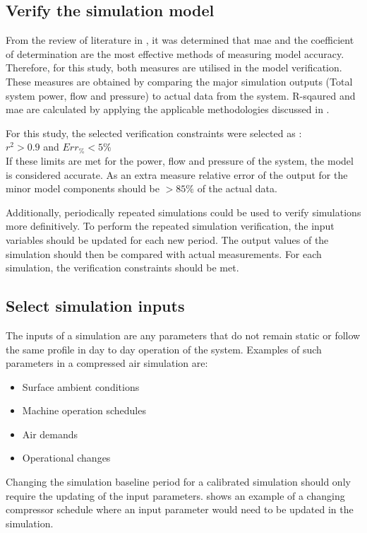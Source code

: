 	\subsection{Verify the simulation model}
	From the review of literature in , it was determined that \gls{mae} and the coefficient of determination are the most effective methods of measuring model accuracy. Therefore, for this study, both measures are utilised in the model verification. These measures are obtained by comparing the major simulation outputs (Total system power, flow and pressure) to actual data from the system. R-sqaured and \gls{mae} are calculated by applying the applicable methodologies discussed in .	
	\par 
	For this study, the selected verification constraints were selected as : \\ {$r^2 > 0.9 $ and $ Err_{\%} < 5\% $}\\ If these limits are met for the power, flow and pressure of the system, the model is considered accurate. As an extra measure relative error of the output for the minor model components should be $ > 85\%$ of the actual data. 
	\par 
	Additionally, periodically repeated simulations could be used to verify simulations more definitively. To perform the repeated simulation verification, the input variables should be updated for each new period. The output values of the simulation should then be compared with actual measurements. For each simulation, the verification constraints should be met.
		
	\subsection{Select simulation inputs}
		The inputs of a simulation are any parameters that do not remain static or follow the same profile in day to day operation of the system. Examples of such parameters in a compressed air simulation are:
		\begin{itemize}
			\item Surface ambient conditions
			\item Machine operation schedules
			\item Air demands
			\item Operational changes
		\end{itemize} 
	Changing the simulation baseline period for a calibrated simulation should only require the updating of the input parameters.  shows an example of a changing compressor schedule where an input parameter would need to be updated in the simulation.	

